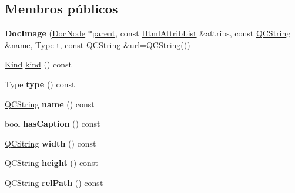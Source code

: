 \subsection*{Membros públicos}
\begin{DoxyCompactItemize}
\item 
\hypertarget{class_doc_image_a1b9d15173d6ad35c83147ae625a7ff87}{{\bfseries Doc\-Image} (\hyperlink{class_doc_node}{Doc\-Node} $\ast$\hyperlink{class_doc_node_abd7f070d6b0a38b4da71c2806578d19d}{parent}, const \hyperlink{class_html_attrib_list}{Html\-Attrib\-List} \&attribs, const \hyperlink{class_q_c_string}{Q\-C\-String} \&name, Type t, const \hyperlink{class_q_c_string}{Q\-C\-String} \&url=\hyperlink{class_q_c_string}{Q\-C\-String}())}\label{class_doc_image_a1b9d15173d6ad35c83147ae625a7ff87}

\item 
\hyperlink{class_doc_node_aa10c9e8951b8ccf714a59ec321bdac5b}{Kind} \hyperlink{class_doc_image_aa9d037bed9f9a083d0cd01485637d843}{kind} () const 
\item 
\hypertarget{class_doc_image_afbd0fa31db28593e9669c3c56711c0a7}{Type {\bfseries type} () const }\label{class_doc_image_afbd0fa31db28593e9669c3c56711c0a7}

\item 
\hypertarget{class_doc_image_af92302878527ec555ba9e3fe066925ff}{\hyperlink{class_q_c_string}{Q\-C\-String} {\bfseries name} () const }\label{class_doc_image_af92302878527ec555ba9e3fe066925ff}

\item 
\hypertarget{class_doc_image_a47d6a6a9de9fe305f0a40bc7ab568e28}{bool {\bfseries has\-Caption} () const }\label{class_doc_image_a47d6a6a9de9fe305f0a40bc7ab568e28}

\item 
\hypertarget{class_doc_image_a3b2930dfedd2909fb77430aee4aba6fa}{\hyperlink{class_q_c_string}{Q\-C\-String} {\bfseries width} () const }\label{class_doc_image_a3b2930dfedd2909fb77430aee4aba6fa}

\item 
\hypertarget{class_doc_image_ab6aa5410ea982fcf57c2dbb7e9701858}{\hyperlink{class_q_c_string}{Q\-C\-String} {\bfseries height} () const }\label{class_doc_image_ab6aa5410ea982fcf57c2dbb7e9701858}

\item 
\hypertarget{class_doc_image_a3aa6799d4713d51d9cc4862af165671c}{\hyperlink{class_q_c_string}{Q\-C\-String} {\bfseries rel\-Path} () const }\label{class_doc_image_a3aa6799d4713d51d9cc4862af165671c}


\end{DoxyCompactItemize}

